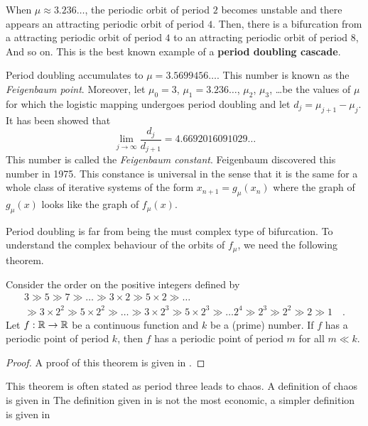 When $\mu \approx 3.236\ldots$, the periodic orbit of period $2$
becomes unstable and there appears an attracting periodic orbit of
period $4$.  Then, there is a bifurcation from a attracting periodic
orbit of period $4$ to an attracting periodic orbit of period $8$,
And so on.  This is the best known example of a
{\bfseries period doubling cascade}.

Period doubling accumulates to $\mu = 3.5699456\ldots$.  This number
is known as the {\em Feigenbaum point}.  Moreover, let $\mu_0=3$,
$\mu_1=3.236\ldots$, $\mu_2$, $\mu_3$, \ldots be the values of $\mu$
for which the logistic mapping undergoes period doubling and let
$d_j = \mu_{j+1}-\mu_j$.  It has been showed that
\[
\lim_{j\rightarrow \infty} \frac{d_j}{d_{j+1}} =
4.6692016091029\ldots
\]
This number is called the
{\em Feigenbaum constant}.  Feigenbaum
discovered this number in 1975.  This constance is universal in the
sense that it is the same for a whole class of iterative systems of
the form $x_{n+1} = g_\mu(x_n)$ where the graph of $g_\mu(x)$ looks
like the graph of $f_\mu(x)$.

Period doubling is far from being the must complex type of
bifurcation. To understand the complex behaviour of the orbits of
$f_\mu$, we need the following theorem.

\begin{theo}[Sarkovskii]
Consider the order on the positive integers
 defined by
\begin{multline*}
3 \gg 5 \gg 7 \gg \ldots
\gg 3\times 2 \gg 5\times 2 \gg \ldots \\
\gg 3\times 2^2 \gg 5\times 2^2 \gg \ldots
\gg 3\times 2^3 \gg 5\times 2^3 \gg \ldots
2^4 \gg 2^3 \gg 2^2 \gg 2 \gg 1 \quad .
\end{multline*}
Let $f:\mathbb{R} \rightarrow \mathbb{R}$ be a continuous function and $k$ be a
(prime) number.  If $f$ has a periodic point of period $k$, then $f$ has
a periodic point of period $m$ for all $m \ll k$.
\end{theo}

\begin{proof}
A proof of this theorem is given in \cite[page 60]{D}.
\end{proof}

This theorem is often stated as period three leads to chaos.
A definition of chaos is given in \cite[Definition 8.5]{D}
The definition given in \cite{D} is not the most economic, a simpler
definition is given in \cite{BBCDS, AG} 

